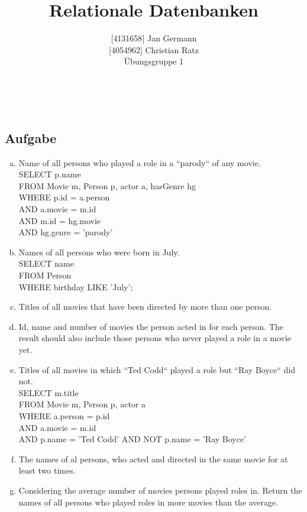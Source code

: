 \documentclass[11pt,a4paper,DIV=9]{scrartcl}
\author{{[}4131658{]} Jan Germann \\{[}4054962{]} Christian Ratz\\Übungsgruppe 1}
\title{Relationale Datenbanken}
\newcounter{temp}
\newcommand{\aufgabe}[1]{
  \setcounter{temp}{\value{subsection}}
  \setcounter{subsection}{#1}
  \addtocounter{subsection}{-1}
  \subsection{Aufgabe}
  \setcounter{subsection}{\value{temp}}
}
\renewcommand{\author}[1]{\renewcommand{\author}{#1}}
\renewcommand{\title}[1]{\renewcommand{\title}{#1}}
\newcommand{\makehomeworktitle}{
  \begin{minipage}[t]{6.5cm}
    \sf{\author}
  \end{minipage}
  \begin{minipage}[t]{6.5cm}
    \begin{flushright}
      \sf{\title\\\today}
    \end{flushright}
  \end{minipage}
  \\[0.2cm]
  \begin{center}
    \sf{
      \color{blue}{
        \LARGE{Aufgabenblatt \blattnr}
      }
    }
  \end{center}
  \vspace{0.1cm}
}
\begin{document}
\makehomeworktitle
\aufgabe{1}
  \begin{enumerate}[a.]
    	\item Name of all persons who played a role in a ``parody`` of any movie.\hfill\\
	SELECT p.name \\
	FROM Movie m, Person p, actor a, hasGenre hg \\
	WHERE p.id = a.person \\
	AND a.movie = m.id \\
	AND m.id = hg.movie \\
 	AND hg.genre = 'parody'

       	\item Names of all persons who were born in July.\hfill\\
	SELECT name \\
	FROM Person \\
	WHERE birthday LIKE 'July';
	
           \item Titles of all movies that have been directed by more than one person.\hfill\\

           \item Id, name and number of movies the person acted in for each person. The result should also include those persons who never played a role in a movie yet.\hfill\\

           \item Titles of all movies in which ``Ted Codd`` played a role but ``Ray Boyce`` did not.\hfill\\
           SELECT m.title \\
           FROM Movie m, Person p, actor a \\ 
           WHERE a.person = p.id \\
           AND a.movie = m.id \\
           AND p.name = 'Ted Codd'
           AND NOT p.name = 'Ray Boyce'

           \item The names of al persons, who acted and directed in the same movie for at least two times.\hfill\\

           \item Considering the average number of movies persons played roles in. Return the names of all persons who played roles in more movies than the average.\hfill\\

    \end{enumerate}
\end{document}
